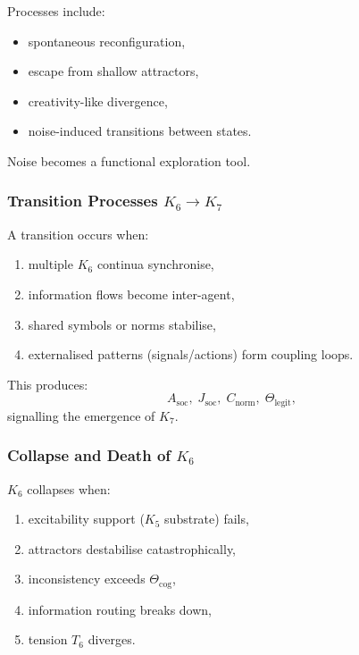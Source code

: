 Processes include:
\begin{itemize}
    \item spontaneous reconfiguration,
    \item escape from shallow attractors,
    \item creativity-like divergence,
    \item noise-induced transitions between states.
\end{itemize}

Noise becomes a functional exploration tool.

\subsubsection{Transition Processes \texorpdfstring{$K_6 \to K_7$}{K_6 \to K_7}}

A transition occurs when:
\begin{enumerate}
    \item multiple $K_6$ continua synchronise,
    \item information flows become inter-agent,
    \item shared symbols or norms stabilise,
    \item externalised patterns (signals/actions) form coupling loops.
\end{enumerate}

This produces:
\[
A_{\text{soc}},\; J_{\text{soc}},\;
C_{\text{norm}},\;
\Theta_{\text{legit}},
\]
signalling the emergence of $K_7$.

\subsubsection{Collapse and Death of \texorpdfstring{$K_6$}{K_6}}

$K_6$ collapses when:
\begin{enumerate}
    \item excitability support ($K_5$ substrate) fails,
    \item attractors destabilise catastrophically,
    \item inconsistency exceeds $\Theta_{\text{cog}}$,
    \item information routing breaks down,
    \item tension $T_6$ diverges.
\end{enumerate}

